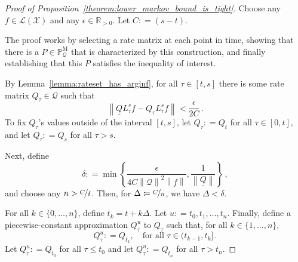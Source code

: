 \documentclass[10pt]{paper}
\theoremstyle{definition}
\newcommand{\reals}{\mathbb{R}}
\newcommand{\realspos}{\reals_{>0}}
\newcommand{\states}{\mathcal{X}}
\newcommand{\processes}{\mathbb{P}}
\newcommand{\mprocesses}{\processes^{\mathrm{M}}}
\newcommand{\lbound}{L}
\newcommand{\gambles}{\mathcal{L}}
\newcommand{\gamblesX}{\gambles(\states)}
\newcommand{\rateset}{\mathcal{Q}}
\newcommand{\lrate}{\underline{Q}}
\newcommand{\norm}[1]{\left\lVert #1 \right\rVert}
\newcommand{\coloneqq}{:\!=}
\newcommand{\argmin}{\arg\min}
\begin{document}
\begin{proof}[Proof of Proposition~\ref{theorem:lower_markov_bound_is_tight}]
Choose any $f\in\gamblesX$ and any $\epsilon\in\realspos$. Let $C\coloneqq (s-t)$. 

The proof works by selecting a rate matrix at each point in time, showing that there is a $P\in\mprocesses_\rateset$ that is characterized by this construction, and finally establishing that this $P$ satisfies the inequality of interest.

By Lemma~\ref{lemma:rateset_has_arginf}, for all $\tau\in[t,s]$ there is some rate matrix $Q_\tau\in\rateset$ such that
\begin{equation}\label{eq:lower_char_rate_matrix}
\norm{\lrate \lbound_\tau^sf - Q_\tau \lbound_\tau^sf} < \frac{\epsilon}{2C}\,.
\end{equation}
To fix $Q_\tau$'s values outside of the interval $[t,s]$, let $Q_\tau \coloneqq Q_t$ for all $\tau\in[0,t]$, and let $Q_\tau\coloneqq Q_s$ for all $\tau>s$.

Next, define
\begin{equation}\label{eq:delta_required_for_tight_bound}
\delta \coloneqq \min\left\{\frac{\epsilon}{4C\norm{\mathcal{Q}}^2\norm{f}},\frac{1}{\norm{\lrate}}\right\}\,,
\end{equation}
and choose any $n>\nicefrac{C}{\delta}$. Then, for $\Delta\coloneqq \nicefrac{C}{n}$, we have $\Delta<\delta$.

For all $k\in\{0,\ldots,n\}$, define $t_k=t+k\Delta$. Let $u\coloneqq t_0,t_1,\ldots,t_n$. Finally, define a piecewise-constant approximation $Q_\tau^u$ to $Q_\tau$ such that, for all $k\in\{1,\ldots,n\}$,
\begin{equation}\label{eq:lower_char_matrix_linear_approx}
Q_\tau^u \coloneqq Q_{t_k},\quad\text{for all $\tau\in (t_{k-1},t_k]$}\,.
\end{equation}
Let $Q_\tau^u\coloneqq Q_{t_0}$ for all $\tau\leq t_0$ and let $Q_\tau^u\coloneqq Q_{t_n}$ for all $\tau>t_n$.


\end{proof}
\end{document}
